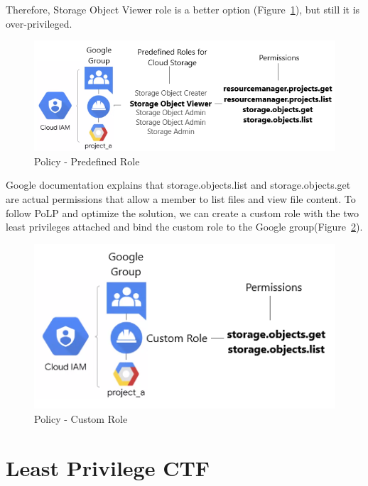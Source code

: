 \documentclass[a4paper,twoside]{article}
\begin{document}
Therefore, Storage Object Viewer role is a better option (Figure~\ref{fig:sto-pre}), but still it is over-privileged. 
\begin{figure}[!h]
  \centering
  \includegraphics[width=\linewidth]{pic/sto-pre}
  \caption {Policy - Predefined Role}
   \label{fig:sto-pre}
\end{figure}
Google documentation explains that storage.objects.list and storage.objects.get are actual permissions that allow a member to list files and view file content. To follow PoLP and optimize the solution, we can create a custom role with the two least privileges attached and bind the custom role to the Google group(Figure~\ref{fig:sto-cus}).
\begin{figure}[!h]
  \centering
  \includegraphics[width=\linewidth]{pic/sto-cus}
  \caption {Policy - Custom Role}
   \label{fig:sto-cus}
\end{figure}


\section{Least Privilege CTF}
\end{document}
